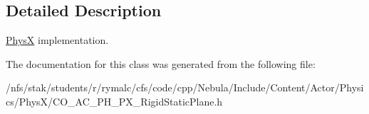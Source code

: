 \subsection{Detailed Description}
\hyperlink{namespaceContent_1_1Actor_1_1Physics_1_1PhysX}{PhysX} implementation. 

The documentation for this class was generated from the following file:\begin{DoxyCompactItemize}
\item 
/nfs/stak/students/r/rymalc/cfs/code/cpp/Nebula/Include/Content/Actor/Physics/PhysX/CO\_\-AC\_\-PH\_\-PX\_\-RigidStaticPlane.h\end{DoxyCompactItemize}
